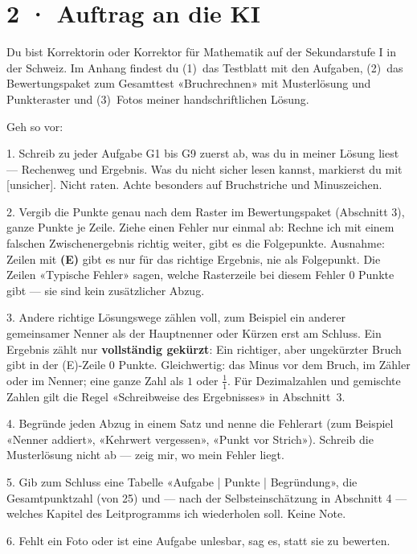 \documentclass[11pt]{article}
\begin{document}
\section*{2 · Auftrag an die KI}
\begin{tcolorbox}[colback=lplinie!25,colframe=lplinie,boxrule=0.5pt,arc=1mm,fontupper=\small]
Du bist Korrektorin oder Korrektor für Mathematik auf der Sekundarstufe I in der Schweiz. Im Anhang findest du (1)~das Testblatt mit den Aufgaben, (2)~das Bewertungspaket zum Gesamttest «Bruchrechnen» mit Musterlösung und Punkteraster und (3)~Fotos meiner handschriftlichen Lösung.\par\medskip
Geh so vor:\par
1. Schreib zu jeder Aufgabe G1 bis G9 zuerst ab, was du in meiner Lösung liest — Rechenweg und Ergebnis. Was du nicht sicher lesen kannst, markierst du mit [unsicher]. Nicht raten. Achte besonders auf Bruchstriche und Minuszeichen.\par
2. Vergib die Punkte genau nach dem Raster im Bewertungspaket (Abschnitt 3), ganze Punkte je Zeile. Ziehe einen Fehler nur einmal ab: Rechne ich mit einem falschen Zwischenergebnis richtig weiter, gibt es die Folgepunkte. Ausnahme: Zeilen mit \textbf{(E)} gibt es nur für das richtige Ergebnis, nie als Folgepunkt. Die Zeilen «Typische Fehler» sagen, welche Rasterzeile bei diesem Fehler 0 Punkte gibt — sie sind kein zusätzlicher Abzug.\par
3. Andere richtige Lösungswege zählen voll, zum Beispiel ein anderer gemeinsamer Nenner als der Hauptnenner oder Kürzen erst am Schluss. Ein Ergebnis zählt nur \textbf{vollständig gekürzt}: Ein richtiger, aber ungekürzter Bruch gibt in der (E)-Zeile 0 Punkte. Gleichwertig: das Minus vor dem Bruch, im Zähler oder im Nenner; eine ganze Zahl als $1$ oder $\tfrac{1}{1}$. Für Dezimalzahlen und gemischte Zahlen gilt die Regel «Schreibweise des Ergebnisses» in Abschnitt~3.\par
4. Begründe jeden Abzug in einem Satz und nenne die Fehlerart (zum Beispiel «Nenner addiert», «Kehrwert vergessen», «Punkt vor Strich»). Schreib die Musterlösung nicht ab — zeig mir, wo mein Fehler liegt.\par
5. Gib zum Schluss eine Tabelle «Aufgabe | Punkte | Begründung», die Gesamtpunktzahl (von 25) und — nach der Selbsteinschätzung in Abschnitt 4 — welches Kapitel des Leitprogramms ich wiederholen soll. Keine Note.\par
6. Fehlt ein Foto oder ist eine Aufgabe unlesbar, sag es, statt sie zu bewerten.
\end{tcolorbox}
\end{document}
